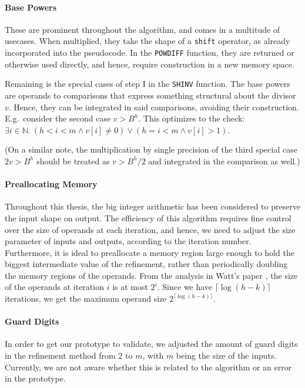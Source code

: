 \paragraph{Base Powers}
These are prominent throughout the algorithm, and comes in a multitude of
usecases. When multiplied, they take the shape of a \texttt{shift} operator, as
already incorporated into the pseudocode. In the \texttt{POWDIFF} function, they
are returned or otherwise used directly, and hence, require construction in a
new memory space.

Remaining is the special cases of step I in the \texttt{SHINV} function. The
base powers are operands to comparisons that express something structural about
the divisor $v$. Hence, they can be integrated in said comparisons, avoiding
their construction.  E.g.\ consider the second case $v > B^h$. This optimizes to
the check: $\exists i\in \mathbb{N}.~(h<i<m \land v[i] \neq 0) \lor (h = i<m \land v[i] > 1)$.

(On a similar note, the multiplication by single precision of the third special
case $2v > B^h$ should be treated as $v > B^h/2$ and integrated in the
comparison as well.)

\paragraph{Preallocating Memory}
Throughout this thesis, the big integer arithmetic has been considered to preserve
the input shape on output. The efficiency of this algorithm requires fine control
over the size of operands at each iteration, and hence, we need to adjust the
size parameter of inputs and outputs, according to the iteration
number. Furthermore, it is ideal to preallocate a memory region large enough to
hold the biggest intermediate value of the refinement, rather than periodically
doubling the memory regions of the operands. From the analysis in Watt's paper
\cite{watt2023efficient}, the size of the operands at iteration $i$ is at most
$2^i$. Since we have $\lceil \log (h-k) \rceil$ iterations, we get the maximum operand
size $2^{\lceil \log (h-k) \rceil}$.

\paragraph{Guard Digits}
In order to get our prototype to validate, we adjusted the amount of guard
digits in the refinement method from $2$ to $m$, with $m$ being the size of the
inputs. Currently, we are not aware whether this is related to the algorithm or
an error in the prototype.

